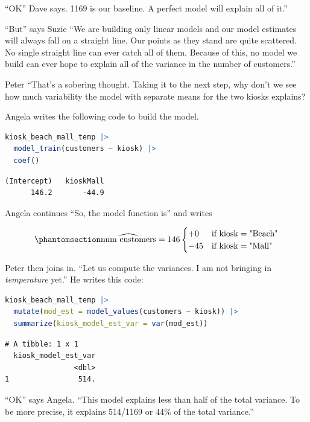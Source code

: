 \documentclass[
  12pt,
  letterpaper,
  DIV=11,
  numbers=noendperiod]{scrreprt}
\begin{document}
``OK'' Dave says. 1169 is our baseline. A perfect model will explain all
of it.''

``But'' says Suzie ``We are building only linear models and our model
estimates will always fall on a straight line. Our points as they stand
are quite scattered. No single straight line can ever catch all of them.
Because of this, no model we build can ever hope to explain all of the
variance in the number of customers.''

Peter ``That's a sobering thought. Taking it to the next step, why don't
we see how much variability the model with separate means for the two
kiosks explains?

Angela writes the following code to build the model.

\begin{lstlisting}[language=R]
kiosk_beach_mall_temp |> 
  model_train(customers ~ kiosk) |> 
  coef()
\end{lstlisting}

\begin{lstlisting}
(Intercept)   kioskMall 
      146.2       -44.9 
\end{lstlisting}

Angela continues ``So, the model function is'' and writes

\begin{equation}\phantomsection\label{eq-kiosk-cat-model-3}{
\widehat{\text{num customers}} = 146 
\begin{cases}
+0 & \text{if } \text{kiosk} = \text{"Beach"} \\
-45 & \text{if } \text{kiosk} = \text{"Mall"} 
\end{cases}
}\end{equation}

Peter then joins in. ``Let us compute the variances. I am not bringing
in \emph{temperature} yet.'' He writes this code:

\begin{lstlisting}[language=R]
kiosk_beach_mall_temp |> 
  mutate(mod_est = model_values(customers ~ kiosk)) |>
  summarize(kiosk_model_est_var = var(mod_est))
\end{lstlisting}

\begin{lstlisting}
# A tibble: 1 x 1
  kiosk_model_est_var
                <dbl>
1                514.
\end{lstlisting}

``OK'' says Angela. ``This model explains less than half of the total
variance. To be more precise, it explains 514/1169 or 44\% of the total
variance.''
\end{document}
